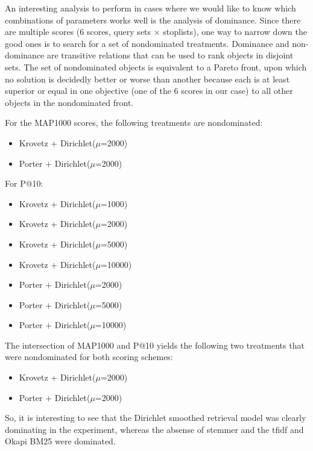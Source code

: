 \documentclass{article} %
\begin{document}
An interesting analysis to perform in cases where we would like to know which combinations of parameters works well is the analysis of dominance. Since there are multiple scores (6 scores, query sets $\times$ stoplists), one way to narrow down the good ones is to search for a set of nondominated treatments. Dominance and non-dominance are transitive relations that can be used to rank objects in disjoint sets. The set of nondominated objects is equivalent to a Pareto front, upon which no solution is decidedly better or worse than another because each is at least superior or equal in one objective (one of the 6 scores in our case) to all other objects in the nondominated front.\newline

For the MAP1000 scores, the following treatments are nondominated:


\begin{itemize}
	\item Krovetz + Dirichlet($\mu$=2000)
	\item Porter  + Dirichlet($\mu$=2000)
\end{itemize} 


For P@10:

\begin{itemize}
	\item Krovetz + Dirichlet($\mu$=1000)
	\item Krovetz + Dirichlet($\mu$=2000)
	\item Krovetz + Dirichlet($\mu$=5000)
	\item Krovetz + Dirichlet($\mu$=10000)
	\item Porter + Dirichlet($\mu$=2000)
	\item Porter + Dirichlet($\mu$=5000)
	\item Porter + Dirichlet($\mu$=10000)
\end{itemize}


The intersection of MAP1000 and P@10 yields the following two treatments that were nondominated for both scoring schemes:

\begin{itemize}
	\item Krovetz + Dirichlet($\mu$=2000)
	\item Porter  + Dirichlet($\mu$=2000)
\end{itemize} 

So, it is interesting to see that the Dirichlet smoothed retrieval model was clearly dominating in the experiment, whereas the absense of stemmer and the tfidf and Okapi BM25 were dominated.
\end{document}
